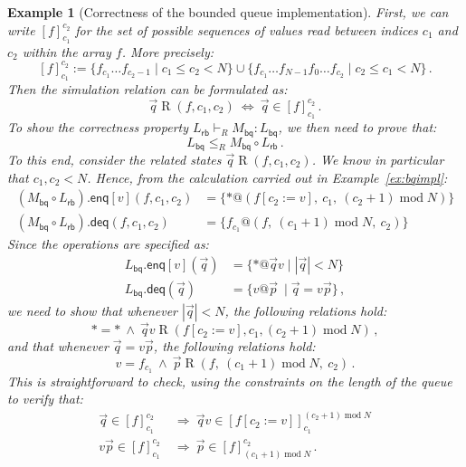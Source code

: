 \documentclass[11pt,oneside,draft]{book}
\newtheorem{example}[theorem]{Example}
\theoremstyle{definition}
\newcommand{\kw}[1]{\ensuremath{ \mathsf{#1} }}
\begin{document}
\begin{example}[Correctness of the bounded queue implementation]
First,
we can write $[f]_{c_1}^{c_2}$
for the set of possible sequences of values
read between indices $c_1$ and $c_2$
within the array $f$.
More precisely:
\[
  [f]_{c_1}^{c_2} :=
    \{ f_{c_1} \ldots f_{c_2 - 1} \mid c_1 \le c_2 < N \} \cup
    \{ f_{c_1} \ldots f_{N-1} f_0 \ldots f_{c_2} \mid c_2 \le c_1 < N \}
  \,.
\]
Then the simulation relation can be formulated as:
\[
  \vec{q} \mathrel{R} (f, c_1, c_2)
  \: \Leftrightarrow \:
  \vec{q} \in [f]_{c_1}^{c_2}
  \,.
\]
To show the correctness property
$
  L_\kw{rb} \vdash_R M_\kw{bq} : L_\kw{bq}
$,
we then need to prove that:
\[
  L_\kw{bq} \le_R M_\kw{bq} \circ L_\kw{rb}
  \,.
\]
To this end,
consider the related states
$\vec{q} \mathrel{R} (f, c_1, c_2)$.
We know in particular that $c_1, c_2 < N$.
Hence, from the calculation
carried out in Example~\ref{ex:bqimpl}:
\begin{align*}
  (M_\kw{bq} \circ L_\kw{rb}).{\kw{enq}[v]}(f, c_1, c_2)
    &= \{ *@(f[c_2 := v], \:
          c_1, \:
          (c_2 + 1) \mathop{\mathrm{mod}} N) \}
  \\
  (M_\kw{bq} \circ L_\kw{rb}).\kw{deq}(f, c_1, c_2)
    &= \{ f_{c_1}@(f, \:
          (c_1 + 1) \mathop{\mathrm{mod}} N, \:
          c_2) \}
\end{align*}
Since the operations are specified as:
\begin{align*}
  L_\kw{bq}.\kw{enq}[v](\vec{q}) &=
    \{ * @ \vec{q} v \mid |\vec{q}| < N \}
  \\
  L_\kw{bq}.\kw{deq}(\vec{q}) &=
    \{ v @ \vec{p} \: \mid \vec{q} = v \vec{p} \}
  \,,
\end{align*}
we need to show that whenever
$|\vec{q}| < N$,
the following relations hold:
\[
  {*} = {*}
  \: \wedge \:
  \vec{q}v \mathrel{R}
    (f[c_2 := v], c_1, (c_2 + 1) \mathop{\mathrm{mod}} N)
  \,,
\]
and that whenever $\vec{q} = v\vec{p}$,
the following relations hold:
\[
  v = f_{c_1}
  \: \wedge \:
  \vec{p} \mathrel{R}
    (f, \:
     (c_1 + 1) \mathop{\mathrm{mod}} N, \:
     c_2)
  \,.
\]
This is straightforward to check,
using the constraints on the length of the queue
to verify that:
\begin{align*}
  \vec{q} \in [f]_{c_1}^{c_2}
    \: &\Rightarrow \:
    \vec{q}v \in [f[c_2 := v]]_{c_1}^{(c_2+1) \mathop{\mathrm{mod}} N}
  \\
  v\vec{p} \in [f]_{c_1}^{c_2}
    \: &\Rightarrow \:
    \vec{p} \in [f]_{(c_1+1) \mathop{\mathrm{mod}} N}^{c_2}
  \,.
\end{align*}
\end{example}
\end{document}
